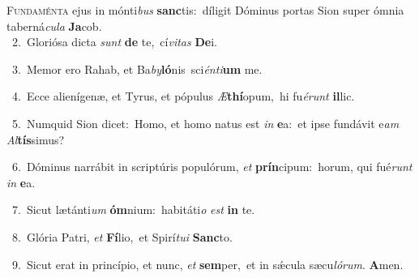 \lettrine{\initial\textcolor{\initialcolor}{F}}{undaménta} ejus in mónti\textit{bus} \textbf{sanc}\-tis:~\star díligit Dóminus portas Sion super ómnia taberná\-\textit{cu}\-\textit{la} \textbf{Ja}\-cob.\\
{\numbfont\textcolor{\numbcolor}{~2.}}~Gloriósa dicta \textit{sunt} \textbf{de} te,~\star cí\-\textit{vi}\-\textit{tas} \textbf{De}\-i.\par
{\numbfont\textcolor{\numbcolor}{~3.}}~Memor ero Rahab, et Ba\-\textit{by}\-\textbf{ló}nis~\star sci\-\textit{én}\-\textit{ti}\textbf{um} me.\par
{\numbfont\textcolor{\numbcolor}{~4.}}~Ecce alienígenæ, et Tyrus, et pópulus \textit{Æ}\-\textbf{thí}opum,~\star hi fu\-\textit{é}\-\textit{runt} \textbf{il}\-lic.\par
{\numbfont\textcolor{\numbcolor}{~5.}}~Numquid Sion dicet:~\dagger Homo, et homo natus est \textit{in} \textbf{e}\-a:~\star et ipse fundávit e\textit{am} \textit{Al}\-\textbf{tís}simus?\par
{\numbfont\textcolor{\numbcolor}{~6.}}~Dóminus narrábit in scriptúris populórum, \textit{et} \textbf{prín}\-cipum:~\star horum, qui fué\textit{runt} \textit{in} \textbf{e}\-a.\par
{\numbfont\textcolor{\numbcolor}{~7.}}~Sicut lætánti\textit{um} \textbf{óm}\-nium:~\star habitáti\textit{o} \textit{est} \textbf{in} te.\par
{\numbfont\textcolor{\numbcolor}{~8.}}~Glória Patri, \textit{et} \textbf{Fí}\-lio,~\star et Spirí\-\textit{tu}\-\textit{i} \textbf{Sanc}\-to.\par
{\numbfont\textcolor{\numbcolor}{~9.}}~Sicut erat in princípio, et nunc, \textit{et} \textbf{sem}\-per,~\star et in sǽcula sæcu\-\textit{ló}\-\textit{rum}. \textbf{A}\-men.\par
